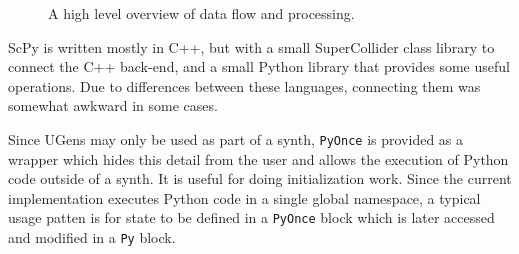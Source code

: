 \documentclass{article}
\begin{document}
\begin{figure}[ht]
    \caption{A high level overview of data flow and processing.}
    \begin{center}
    \end{center}
\end{figure}

ScPy is written mostly in C++, but with a small SuperCollider class library to connect the C++
back-end, and a small Python library that provides some useful operations. Due to differences
between these languages, connecting them was somewhat awkward in some cases.

Since UGens may only be used as part of a synth, \texttt{PyOnce} is provided as a wrapper which
hides this detail from the user and allows the execution of Python code outside of a synth. It is
useful for doing initialization work. Since the current implementation executes Python code in a
single global namespace, a typical usage patten is for state to be defined in a \texttt{PyOnce}
block which is later accessed and modified in a \texttt{Py} block.
\end{document}

